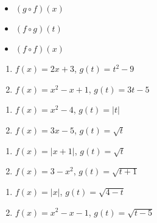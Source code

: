 \begin{multicols}{3}

\begin{itemize}

\item  $(g \circ f)(x)$

\item  $(f \circ g)(t)$

\item  $(f \circ f)(x)$


\end{itemize}

\end{multicols}


\begin{multicols}{2}
\begin{enumerate}
\setcounter{enumi}{\value{HW}}

\item  $f(x) = 2x+3$, $g(t) = t^2-9$ \label{funccompexp1first}
\item  $f(x) = x^2 -x+1$, $g(t) = 3t-5$ 

\setcounter{HW}{\value{enumi}}
\end{enumerate}
\end{multicols}

\begin{multicols}{2}
\begin{enumerate}
\setcounter{enumi}{\value{HW}}

\item  $f(x) = x^2-4$, $g(t) = |t|$
\item  $f(x) = 3x-5$, $g(t) = \sqrt{t}$ 

\setcounter{HW}{\value{enumi}}
\end{enumerate}
\end{multicols}

\begin{multicols}{2}
\begin{enumerate}
\setcounter{enumi}{\value{HW}}

\item  $f(x) = |x+1|$, $g(t) = \sqrt{t}$
\item  $f(x) = 3-x^2$, $g(t) = \sqrt{t+1}$ 

\setcounter{HW}{\value{enumi}}
\end{enumerate}
\end{multicols}

\begin{multicols}{2}
\begin{enumerate}
\setcounter{enumi}{\value{HW}}

\item  $f(x) = |x|$, $g(t) = \sqrt{4-t}$
\item  $f(x) = x^2-x-1$, $g(t) = \sqrt{t-5}$ 

\setcounter{HW}{\value{enumi}}
\end{enumerate}
\end{multicols}

